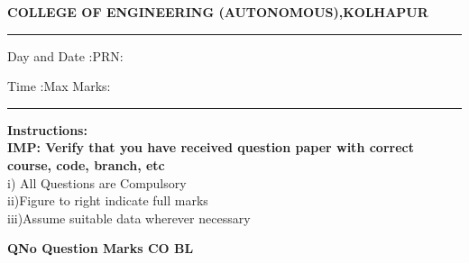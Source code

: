 \documentclass[12pt]{article}
\begin{document}
	\par
	{\bf{COLLEGE OF ENGINEERING (AUTONOMOUS),KOLHAPUR}}
	\par\noindent\rule{\textwidth}{0.4pt}
	
	\par
	\par
	\par
\begin{flushleft}
	Day and Date :{}\hspace{5.5cm}PRN:
\end{flushleft}

\begin{flushleft}
	Time :{}\hspace{7cm}Max Marks:{}\\
\end{flushleft}
\noindent\rule{\textwidth}{0.1pt}
\begin{flushleft}
	{\bf Instructions:}\\
	{\hspace{0.5cm} \bf IMP: Verify that you have received question paper with correct course, code, branch, etc}\\
	\hspace{1cm}i) All Questions are Compulsory\\
	\hspace{1cm}ii)Figure to right indicate full marks\\
	\hspace{1cm}iii)Assume suitable data wherever necessary\\
\end{flushleft} 

	\begin{flushleft}
	\bf{QNo}\hspace{1.2cm} \bf{Question} \hspace{5.5cm}  \bf{Marks} \hspace{0.2cm} \bf{CO} \hspace{0.2cm}	\bf{BL}	
	
	
	
	
	
	
\end{flushleft}

	

	
	
\end{document}
